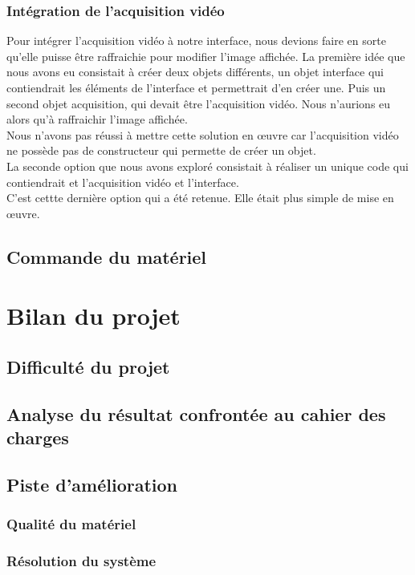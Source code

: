 \documentclass[a4paper]{report}
\begin{document}
            \subsection{Intégration de l'acquisition vidéo}
            Pour intégrer l'acquisition vidéo à notre interface, nous devions faire en sorte qu'elle puisse être raffraichie pour modifier l'image affichée. La première idée que nous avons eu consistait à créer deux objets différents, un objet interface qui contiendrait les éléments de l'interface et permettrait d'en créer une. Puis un second objet acquisition, qui devait être l'acquisition vidéo. Nous n'aurions eu alors qu'à raffraichir l'image affichée.\\
            Nous n'avons pas réussi à mettre cette solution en œuvre car l'acquisition vidéo ne possède pas de constructeur qui permette de créer un objet.\\
            La seconde option que nous avons exploré consistait à réaliser un unique code qui contiendrait et l'acquisition vidéo et l'interface.\\
            C'est cettte dernière option qui a été retenue. Elle était plus simple de mise en œuvre. 
        \section{Commande du matériel}

    \chapter{Bilan du projet}

        \section{Difficulté du projet}
        \section{Analyse du résultat confrontée au cahier des charges}
        \section{Piste d'amélioration}
            \subsection{Qualité du matériel}
            \subsection{Résolution du système}
\end{document}
